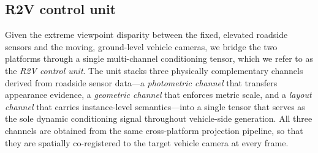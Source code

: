 \subsection*{R2V control unit}\label{sec:condition_signal}

Given the extreme viewpoint disparity between the fixed,
elevated roadside sensors and the moving, ground-level vehicle
cameras, we bridge the two platforms through a single
multi-channel conditioning tensor, which we refer to as the
\emph{R2V control unit}. The unit stacks three physically
complementary channels derived from roadside sensor data---a
\emph{photometric channel} that transfers appearance evidence,
a \emph{geometric channel} that enforces metric scale, and a
\emph{layout channel} that carries instance-level
semantics---into a single tensor that serves as the sole
dynamic conditioning signal throughout vehicle-side
generation. All three channels are obtained from the same
cross-platform projection pipeline, so that they are
spatially co-registered to the target vehicle camera at every
frame.

